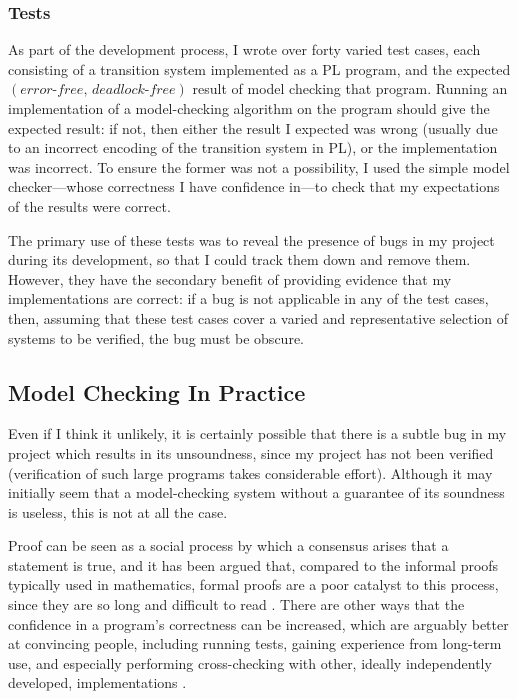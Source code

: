 \documentclass[12pt,a4paper,twoside,openright]{report}
\begin{document}
\subsubsection{Tests}
\label{sec:pl-checker-tests}
As part of the development process,
I wrote over forty varied test cases, each
consisting of a transition system
implemented as a PL program, and
the expected
$(\textit{error-free},\, \textit{deadlock-free})$
result of model checking that program.
Running an implementation of a
model-checking algorithm on the
program should give the expected
result: if not, then either
the result I expected was wrong
(usually due to an incorrect encoding
of the transition system in PL),
or the implementation was incorrect.
To ensure the former was not a possibility,
I used the simple model checker---whose
correctness I have confidence in---to check that my
expectations of the results were correct.

The primary use of these tests was to
reveal the presence of bugs in my
project during its development, so
that I could track them down and
remove them. However, they have the
secondary benefit of providing
evidence that my implementations are
correct: if a bug is not applicable
in any of the test cases, then,
assuming that these test cases cover a
varied and representative selection
of systems to be verified,
the bug must be obscure.

\subsection{Model Checking In Practice}
Even if I think it unlikely, it is
certainly possible that there is a subtle
bug in my project which results in its
unsoundness, since my project has not
been verified (verification of such
large programs takes
considerable effort).
Although it may initially seem
that a model-checking system without
a guarantee of its
soundness is useless, this
is not at all the case.

Proof can be seen as a social process
by which a consensus arises that
a statement is true, and it has been
argued that, compared to the informal
proofs typically used in mathematics,
formal proofs are a
poor catalyst to this process, since
they are so long and difficult to
read \cite{demi79}. There are other
ways that the confidence in a program's
correctness can be increased, which
are arguably better at convincing people, including
running tests, gaining experience from
long-term use, and especially performing
cross-checking with other, ideally
independently developed, implementations
\cite{tau02}.
\end{document}
